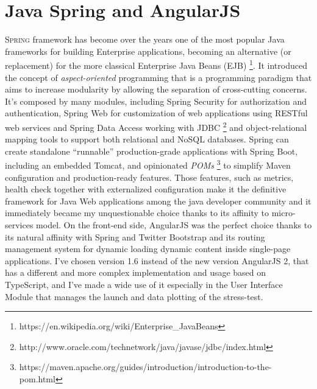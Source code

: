 \section{Java Spring and AngularJS}
\label{sec:3}
\textsc{Spring} framework has become over the years one of the most popular Java frameworks for building  Enterprise applications, becoming an alternative (or replacement) for the more classical Enterprise Java Beans (EJB)  \footnote{https://en.wikipedia.org/wiki/Enterprise\_JavaBeans}. It introduced the concept of \textit{aspect-oriented} programming that is a programming paradigm that aims to increase modularity by allowing the separation of cross-cutting concerns. It’s composed by many modules, including Spring Security for authorization and authentication, Spring Web for customization of web applications using RESTful web services and Spring Data Access working with \textsc{JDBC} \footnote{http://www.oracle.com/technetwork/java/javase/jdbc/index.html} and object-relational mapping tools to support both relational and NoSQL databases. 
Spring can create standalone “runnable” production-grade applications with Spring Boot, including an embedded Tomcat, and opinionated \textit{POMs} \footnote{https://maven.apache.org/guides/introduction/introduction-to-the-pom.html} to simplify Maven configuration and production-ready features.
Those features, such as metrics, health check together with externalized configuration make it the definitive framework for Java Web applications among the java developer community and  it immediately became my unquestionable choice thanks to its affinity to micro-services model.
On the front-end side, AngularJS was the perfect choice thanks to its natural affinity with Spring and Twitter Bootstrap and its routing management system for dynamic loading dynamic content inside single-page applications. I’ve chosen version 1.6 instead of the new version AngularJS 2, that has a different and more complex implementation and usage based on TypeScript, and I’ve made a wide use of it especially in the User Interface Module that manages the launch and data plotting  of the stress-test.

